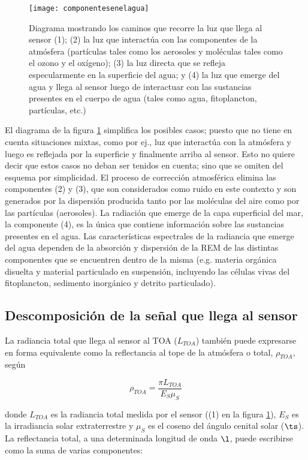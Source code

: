 \begin{figure}[htb]
\centering
\texttt{[image: componentesenelagua]}
\caption {Diagrama mostrando los caminos que recorre la luz que llega al sensor (1); (2) la luz
que interactúa con las componentes de la atmósfera (partículas tales como los aerosoles y
moléculas tales como el ozono y el oxígeno); (3) la luz directa que se refleja especularmente en la
superficie del agua; y (4) la luz que emerge del agua y llega al sensor luego de interactuar con las
sustancias presentes en el cuerpo de agua (tales como agua, fitoplancton, partículas, etc.)} 
\label{fig:componentesenelagua}
\end{figure}

El diagrama de la figura \ref{fig:componentesenelagua} simplifica los posibles casos; puesto que no tiene en cuenta situaciones mixtas, como por ej., luz que interactúa con la atmósfera y luego es reflejada por la superficie y finalmente arriba al sensor. Esto no quiere decir que estos casos no deban ser tenidos en cuenta; sino que se omiten del esquema por simplicidad. El proceso de corrección atmosférica elimina las componentes (2) y (3), que son
considerados como ruido en este contexto y son generados por la dispersión
producida tanto por las moléculas del aire como por las partículas (aerosoles). La
radiación que emerge de la capa superficial del mar, la componente (4), es la única que contiene información sobre las sustancias presentes en el
agua. Las características espectrales de la radiancia que emerge del agua dependen de la absorción y
dispersión de la REM de las distintas componentes que se encuentren dentro de la misma (e.g. materia orgánica disuelta y material particulado en suspensión,
incluyendo las células vivas del fitoplancton, sedimento inorgánico y detrito
particulado).

\subsection{Descomposición de la señal que llega al sensor}
La radiancia total que llega al sensor al TOA ($L_{TOA}$) también
puede expresarse en forma equivalente como la reflectancia al tope de la
atmósfera o total, $\rho_{TOA}$, según

\begin{equation}
\rho_{TOA}=\frac{\pi L_{TOA}}{E_{S}\mu_{S}}
\label{rhovsL}
\end{equation}

donde $L_{TOA}$ es la radiancia total medida por el sensor ((1) en la figura \ref{fig:componentesenelagua}), $E_{S}$ es la
irradiancia solar extraterrestre y $\mu_{S}$ es el coseno del ángulo cenital solar ($\ts$).
La reflectancia total, a una determinada longitud de onda $\l$, puede escribirse como
la suma de varias componentes:

